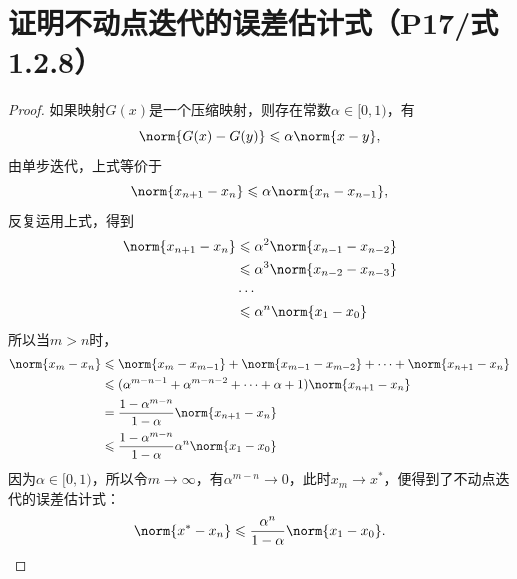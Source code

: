 \documentclass{homework}
\begin{document}
\section{证明不动点迭代的误差估计式（P17/式1.2.8）}
    \begin{proof}
    如果映射$G(x)$是一个压缩映射，则存在常数$\alpha \in[0,1)$，有$$\norm{G(x)-G(y)}\leqslant \alpha \norm{x-y},$$由单步迭代，上式等价于$$\norm{x_{n+1}-x_n} \leqslant \alpha \norm{x_n-x_{n-1}},$$反复运用上式，得到
    \begin{align*}
    \norm{x_{n+1}-x_n} & \leqslant \alpha^2 \norm{x_{n-1}-x_{n-2}}  \\
    & \leqslant \alpha^3 \norm{x_{n-2}-x_{n-3}} \\
    & \cdots \\
    & \leqslant \alpha^n \norm{x_1-x_0} \\
    \end{align*}
    所以当$m>n$时，
    \begin{align*}
    \norm{x_m-x_n} & \leqslant \norm{x_m-x_{m-1}} + \norm{x_{m-1}-x_{m-2}} + \cdots + \norm{x_{n+1}-x_n}  \\
    & \leqslant ( \alpha^{m-n-1} + \alpha^{m-n-2} + \cdots + \alpha + 1 ) \norm{x_{n+1}-x_n} \\
    & = \frac{1-\alpha^{m-n}}{1-\alpha}\norm{x_{n+1}-x_n} \\
    & \leqslant \frac{1-\alpha^{m-n}}{1-\alpha} \alpha^n \norm{x_1-x_0}
    \end{align*}
    因为$\alpha \in [0,1)$，所以令$m\to\infty$，有$\alpha^{m-n} \to 0$，此时$x_m\to x^*$，便得到了不动点迭代的误差估计式：$$\norm{x^*-x_n} \leqslant \frac{\alpha^n}{1-\alpha} \norm{x_1-x_0}.$$
    \end{proof}
    \clearpage
\end{document}
